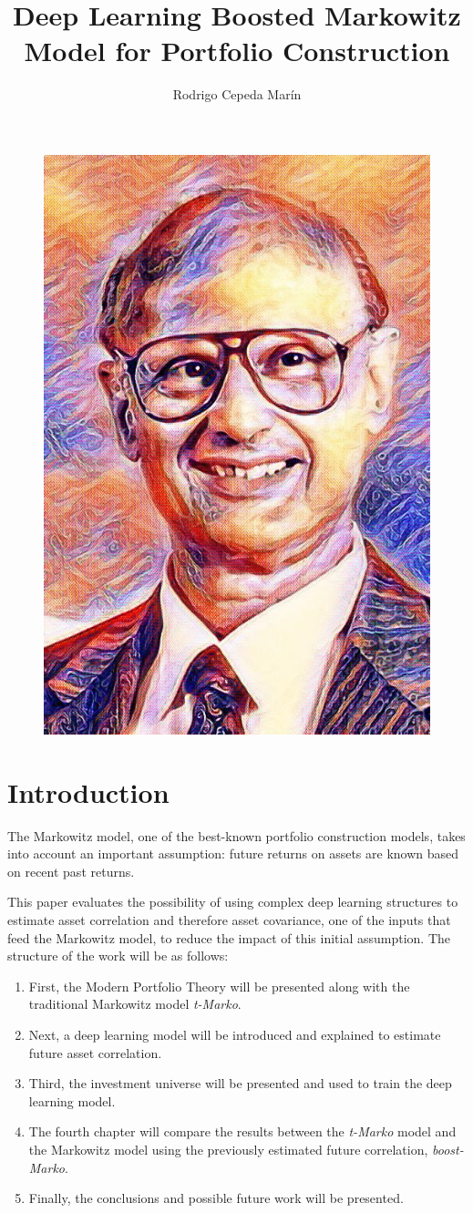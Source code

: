 \documentclass{article}
\title{Deep Learning Boosted Markowitz Model for Portfolio Construction}
\author{Rodrigo Cepeda Marín}
\begin{document}
\maketitle
\begin{figure}[H]
\begin{center}
\includegraphics[width=0.6\linewidth]{Plots/marko.jpg}

\end{center}
\end{figure}

\clearpage

\section{Introduction}
\label{intro}
The Markowitz model, one of the best-known portfolio construction models, takes into account an important assumption: future returns on assets are known based on recent past returns.

This paper evaluates the possibility of using complex deep learning structures to estimate asset correlation and therefore asset covariance, one of the inputs that feed the Markowitz model, to reduce the impact of this initial assumption. The structure of the work will be as follows:
\begin{enumerate}
    \item First, the Modern Portfolio Theory will be presented along with the traditional Markowitz model \textit{t-Marko}.
    \item Next, a deep learning model will be introduced and explained to estimate future asset correlation.
    \item Third, the investment universe will be presented and used to train the deep learning model.
    \item The fourth chapter will compare the results between the \textit{t-Marko} model and the Markowitz model using the previously estimated future correlation, \textit{boost-Marko}.
    \item Finally, the conclusions and possible future work will be presented.
\end{enumerate}
\end{document}

